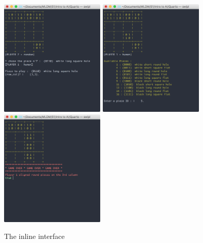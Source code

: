 \documentclass[a4paper,11pt]{article}
\begin{document}
		\begin{figure}[ht]
			\begin{center}
				\includegraphics[width=5cm]{include/inline1.png}
				\includegraphics[width=5cm]{include/inline2.png}
				\includegraphics[width=5cm]{include/inline3.png}
			\caption{The inline interface}
			\end{center}
		\end{figure}
\end{document}
